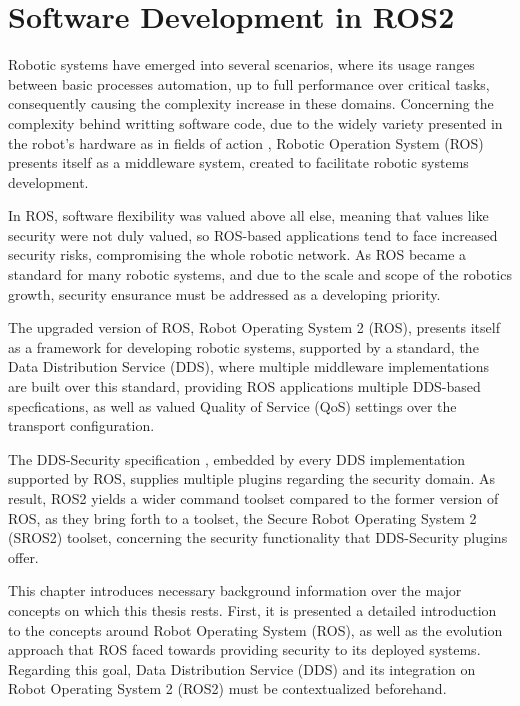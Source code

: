 \chapter{Software Development in ROS2}\label{c:ros}

Robotic systems have emerged into several scenarios, where its usage ranges between basic processes automation, up to full performance over critical tasks, consequently causing the complexity increase in these domains. Concerning the complexity behind writting software code, due to the widely variety presented in the robot's hardware as in fields of action \cite{cousins2011exponential}, Robotic Operation System (ROS) presents itself as a middleware system, created to facilitate robotic systems development.

In ROS, software flexibility was valued above all else, meaning that values like security were not duly valued, so ROS-based applications tend to face increased security risks, compromising the whole robotic network. As ROS became a standard for many robotic systems, and due to the scale and scope of the robotics growth, security ensurance must be addressed as a developing priority. \cite{diluoffo2018robot, kim2018security}

The upgraded version of ROS, Robot Operating System 2 (ROS), presents itself as a framework for developing robotic systems, supported by a standard, the Data Distribution Service (DDS), where multiple middleware implementations are built over this standard, providing ROS applications multiple DDS-based specfications, as well as valued Quality of Service (QoS) settings over the transport configuration. 

The DDS-Security specification \cite{dds-s}, embedded by every DDS implementation supported by ROS, supplies multiple plugins regarding the security domain. As result, ROS2 yields a wider command toolset compared to the former version of ROS, as they bring forth to a toolset, the Secure Robot Operating System 2 (SROS2) toolset, concerning the security functionality that DDS-Security plugins offer.

This chapter introduces necessary background information over the major concepts on which this thesis rests. First, it is presented a detailed introduction to the concepts around Robot Operating System (ROS), as well as the evolution approach that ROS faced towards providing security to its deployed systems. Regarding this goal, Data Distribution Service (DDS) and its integration on Robot Operating System 2 (ROS2) must be contextualized beforehand.


